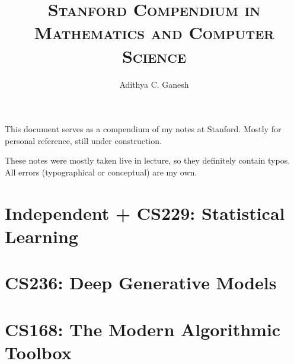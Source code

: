 \title{\textsc{Stanford Compendium in Mathematics and Computer Science}}
\author{Adithya C. Ganesh}
\maketitle

This document serves as a compendium of my notes at Stanford.  Mostly for personal reference, still under construction.

These notes were mostly taken live in lecture, so they definitely contain typos.  All errors (typographical or conceptual) are my own.

\tableofcontents

\mainmatter


\chapter{Independent + CS229: Statistical Learning}

\chapter{CS236: Deep Generative Models}

\chapter{CS168: The Modern Algorithmic Toolbox}

%
%

%


%


